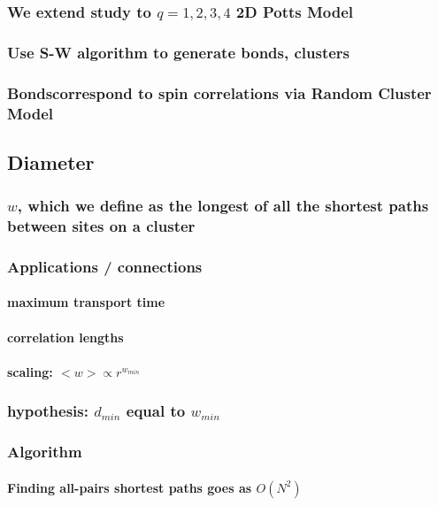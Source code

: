\documentclass[pre,preprint]{revtex4-1}
\begin{document}
\subsubsection{We extend study to $q=1,2,3,4$ 2D Potts Model}
\label{sec-1.2.3}
\subsubsection{Use S-W algorithm to generate bonds, clusters}
\label{sec-1.2.4}
\subsubsection{Bondscorrespond to spin correlations via Random Cluster Model}
\label{sec-1.2.5}
\subsection{Diameter}
\label{sec-1.3}
\subsubsection{$w$, which we define as the longest of all the shortest paths between sites on a cluster}
\label{sec-1.3.1}
\subsubsection{Applications / connections}
\label{sec-1.3.2}
\paragraph{maximum transport time}
\label{sec-1.3.2.1}
\paragraph{correlation lengths}
\label{sec-1.3.2.2}
\paragraph{scaling: $< w > \propto r^{w_{min}}$}
\label{sec-1.3.2.3}
\subsubsection{hypothesis: $d_{min}$ equal to $w_{min}$}
\label{sec-1.3.3}
\subsubsection{Algorithm}
\label{sec-1.3.4}
\paragraph{Finding all-pairs shortest paths goes as $O(N^2)$}
\label{sec-1.3.4.1}
\end{document}
